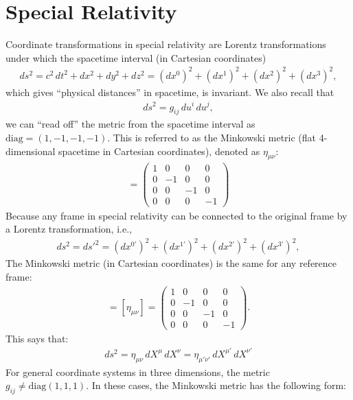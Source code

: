 \documentclass{book}
\theoremstyle{definition}
\begin{document}
\section{Special Relativity}
Coordinate transformations in special relativity are Lorentz transformations under which the spacetime interval (in Cartesian coordinates)
\begin{align*}
ds^2 = c^2\,dt^2 + dx^2 +dy^2+dz^2 = \left(dx^0 \right)^2 + \left(dx^1 \right)^2 + \left(dx^2 \right)^2 + \left(dx^3 \right)^2,
\end{align*}
which gives ``physical distances'' in spacetime, is invariant. We also recall that
\begin{align*}
ds^2 = g_{ij}\,du^i\,du^j,
\end{align*}
we can ``read off'' the metric from the spacetime interval as $\text{diag} = (1,-1,-1,-1)$. This is referred to as the Minkowski metric (flat 4-dimensional spacetime in Cartesian coordinates), denoted as $\eta_{\mu\nu}$:
\begin{align*}
[\eta_{\mu\nu}] = 
\begin{pmatrix}
1 & 0 & 0 & 0\\
0 & -1 & 0 & 0\\
0 & 0 & -1 & 0\\
0 & 0 & 0 & -1
\end{pmatrix}
\end{align*}
Because any frame in special relativity can be connected to the original frame by a Lorentz transformation, i.e.,
\begin{align*}
ds^2 = {ds'}^2 = \left(dx^{0'} \right)^2 + \left(dx^{1'} \right)^2  + \left(dx^{2'} \right)^2 + \left(dx^{3'} \right)^2, 
\end{align*}
The Minkowski metric (in Cartesian coordinates) is the same for any reference frame:
\begin{align*}
[\eta_{\mu'\nu'}] = [\eta_{\mu\nu}] = 
\begin{pmatrix}
1 & 0 & 0 & 0\\
0 & -1 & 0 & 0\\
0 & 0 & -1 & 0\\
0 & 0 & 0 & -1
\end{pmatrix}.
\end{align*}
This says that:
\begin{align*}
\boxed{ds^2 = \eta_{\mu\nu}\,dX^\mu\,dX^\nu = \eta_{\mu'\nu'}\,dX^{\mu'}\,dX^{\nu'}}
\end{align*}
For general coordinate systems in three dimensions, the metric $g_{ij} \neq \text{diag}(1,1,1)$. In these cases, the Minkowski metric has the following form:
\end{document}
